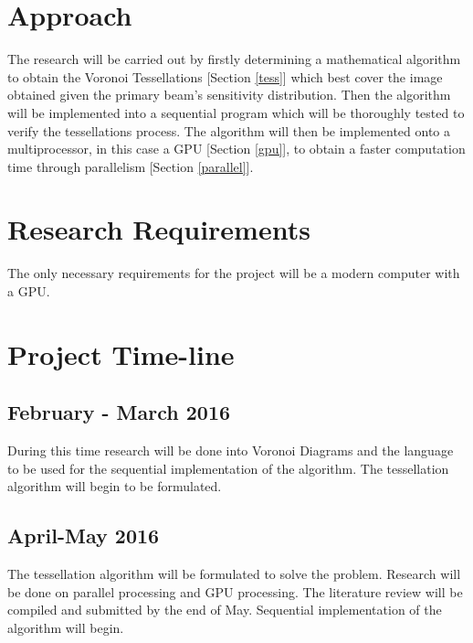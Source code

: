 \documentclass{article}
\begin{document}
\section{Approach}
The research will be carried out by firstly determining a mathematical algorithm to obtain the Voronoi Tessellations [Section \ref{tess}] which best cover the image obtained given the primary beam's sensitivity distribution. Then the algorithm will be implemented into a sequential program which will be thoroughly tested to verify the tessellations process. The algorithm will then be implemented onto a multiprocessor, in this case a GPU [Section \ref{gpu}], to obtain a faster computation time through parallelism [Section \ref{parallel}].
\section{Research Requirements}
The only necessary requirements for the project will be a modern computer with a GPU.
\section{Project Time-line}

\subsection{February - March 2016}
During this time research will be done into Voronoi Diagrams and the language to be used for the sequential implementation of the algorithm. The tessellation algorithm will begin to be formulated.

\subsection{April-May 2016}
The tessellation algorithm will be formulated to solve the problem. Research will be done on parallel processing and GPU processing. The literature review will be compiled and submitted by the end of May. Sequential implementation of the algorithm will begin.
\end{document}
